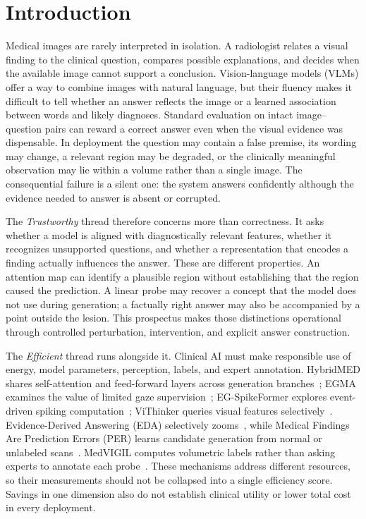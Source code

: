 \section{Introduction}\label{sec:introduction}
Medical images are rarely interpreted in isolation. A radiologist relates a visual finding to the clinical question, compares possible explanations, and decides when the available image cannot support a conclusion. Vision-language models (VLMs) offer a way to combine images with natural language, but their fluency makes it difficult to tell whether an answer reflects the image or a learned association between words and likely diagnoses. Standard evaluation on intact image--question pairs can reward a correct answer even when the visual evidence was dispensable. In deployment the question may contain a false premise, its wording may change, a relevant region may be degraded, or the clinically meaningful observation may lie within a volume rather than a single image. The consequential failure is a silent one: the system answers confidently although the evidence needed to answer is absent or corrupted.

The \emph{Trustworthy} thread therefore concerns more than correctness. It asks whether a model is aligned with diagnostically relevant features, whether it recognizes unsupported questions, and whether a representation that encodes a finding actually influences the answer. These are different properties. An attention map can identify a plausible region without establishing that the region caused the prediction. A linear probe may recover a concept that the model does not use during generation; a factually right answer may also be accompanied by a point outside the lesion. This prospectus makes those distinctions operational through controlled perturbation, intervention, and explicit answer construction.

The \emph{Efficient} thread runs alongside it. Clinical AI must make responsible use of energy, model parameters, perception, labels, and expert annotation. HybridMED shares self-attention and feed-forward layers across generation branches~\citep{hybridmed}; EGMA examines the value of limited gaze supervision~\citep{egma}; EG-SpikeFormer explores event-driven spiking computation~\citep{egspike}; ViThinker queries visual features selectively~\citep{vithinker}. Evidence-Derived Answering (EDA) selectively zooms~\citep{eda}, while Medical Findings Are Prediction Errors (PER) learns candidate generation from normal or unlabeled scans~\citep{per}. MedVIGIL computes volumetric labels rather than asking experts to annotate each probe~\citep{medtmi}. These mechanisms address different resources, so their measurements should not be collapsed into a single efficiency score. Savings in one dimension also do not establish clinical utility or lower total cost in every deployment.

